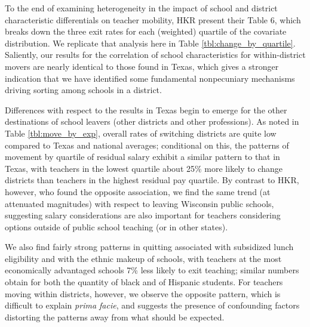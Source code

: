 \documentclass[12pt,]{article}
\begin{document}
To the end of examining heterogeneity in the impact of school and
district characteristic differentials on teacher mobility, HKR present
their Table 6, which breaks down the three exit rates for each
(weighted) quartile of the covariate distribution. We replicate that
analysis here in Table \ref{tbl:change_by_quartile}. Saliently, our
results for the correlation of school characteristics for
within-district movers are nearly identical to those found in Texas,
which gives a stronger indication that we have identified some
fundamental nonpecuniary mechanisms driving sorting among schools in a
district.

Differences with respect to the results in Texas begin to emerge for the
other destinations of school leavers (other districts and other
professions). As noted in Table \ref{tbl:move_by_exp}, overall rates of
switching districts are quite low compared to Texas and national
averages; conditional on this, the patterns of movement by quartile of
residual salary exhibit a similar pattern to that in Texas, with
teachers in the lowest quartile about 25\% more likely to change
districts than teachers in the highest residual pay quartile. By
contrast to HKR, however, who found the opposite association, we find
the same trend (at attenuated magnitudes) with respect to leaving
Wisconsin public schools, suggesting salary considerations are also
important for teachers considering options outside of public school
teaching (or in other states).

We also find fairly strong patterns in quitting associated with
subsidized lunch eligibility and with the ethnic makeup of schools, with
teachers at the most economically advantaged schools 7\% less likely to
exit teaching; similar numbers obtain for both the quantity of black and
of Hispanic students. For teachers moving within districts, however, we
observe the opposite pattern, which is difficult to explain \emph{prima
facie}, and suggests the presence of confounding factors distorting the
patterns away from what should be expected.
\end{document}
